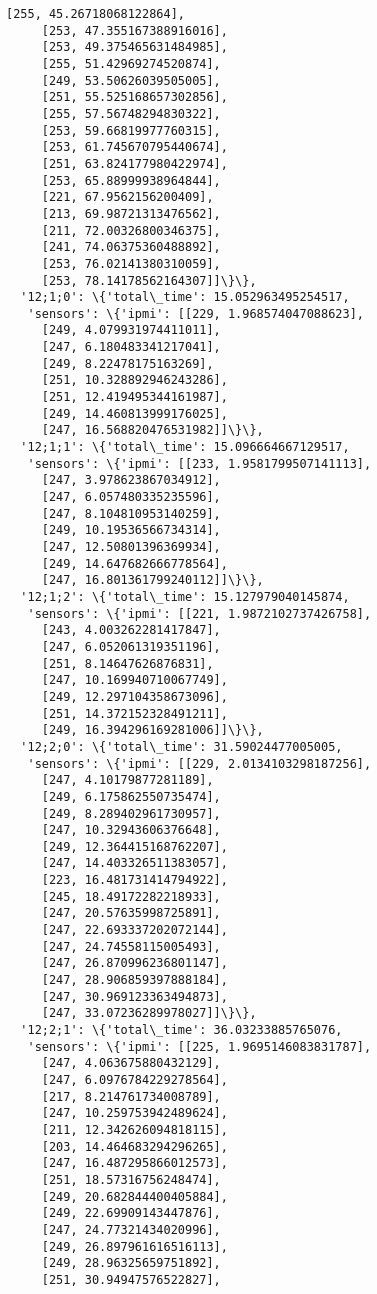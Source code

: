 \documentclass[11pt]{article}
\begin{document}
\begin{tcolorbox}[breakable, size=fbox, boxrule=.5pt, pad at break*=1mm, opacityfill=0]
\begin{Verbatim}[commandchars=\\\{\}]
     [255, 45.26718068122864],
     [253, 47.355167388916016],
     [253, 49.375465631484985],
     [255, 51.42969274520874],
     [249, 53.50626039505005],
     [251, 55.525168657302856],
     [255, 57.56748294830322],
     [253, 59.66819977760315],
     [253, 61.745670795440674],
     [251, 63.824177980422974],
     [253, 65.88999938964844],
     [221, 67.9562156200409],
     [213, 69.98721313476562],
     [211, 72.00326800346375],
     [241, 74.06375360488892],
     [253, 76.02141380310059],
     [253, 78.14178562164307]]\}\},
  '12;1;0': \{'total\_time': 15.052963495254517,
   'sensors': \{'ipmi': [[229, 1.968574047088623],
     [249, 4.079931974411011],
     [247, 6.180483341217041],
     [249, 8.22478175163269],
     [251, 10.328892946243286],
     [251, 12.419495344161987],
     [249, 14.460813999176025],
     [247, 16.568820476531982]]\}\},
  '12;1;1': \{'total\_time': 15.096664667129517,
   'sensors': \{'ipmi': [[233, 1.9581799507141113],
     [247, 3.978623867034912],
     [247, 6.057480335235596],
     [247, 8.104810953140259],
     [249, 10.19536566734314],
     [247, 12.50801396369934],
     [249, 14.647682666778564],
     [247, 16.801361799240112]]\}\},
  '12;1;2': \{'total\_time': 15.127979040145874,
   'sensors': \{'ipmi': [[221, 1.9872102737426758],
     [243, 4.003262281417847],
     [247, 6.052061319351196],
     [251, 8.14647626876831],
     [247, 10.169940710067749],
     [249, 12.297104358673096],
     [251, 14.372152328491211],
     [249, 16.394296169281006]]\}\},
  '12;2;0': \{'total\_time': 31.59024477005005,
   'sensors': \{'ipmi': [[229, 2.0134103298187256],
     [247, 4.10179877281189],
     [249, 6.175862550735474],
     [249, 8.289402961730957],
     [247, 10.32943606376648],
     [249, 12.364415168762207],
     [247, 14.403326511383057],
     [223, 16.481731414794922],
     [245, 18.49172282218933],
     [247, 20.57635998725891],
     [247, 22.693337202072144],
     [247, 24.74558115005493],
     [247, 26.870996236801147],
     [247, 28.906859397888184],
     [247, 30.969123363494873],
     [247, 33.07236289978027]]\}\},
  '12;2;1': \{'total\_time': 36.03233885765076,
   'sensors': \{'ipmi': [[225, 1.9695146083831787],
     [247, 4.063675880432129],
     [247, 6.0976784229278564],
     [217, 8.214761734008789],
     [247, 10.259753942489624],
     [211, 12.342626094818115],
     [203, 14.464683294296265],
     [247, 16.487295866012573],
     [251, 18.57316756248474],
     [249, 20.682844400405884],
     [249, 22.69909143447876],
     [247, 24.77321434020996],
     [249, 26.897961616516113],
     [249, 28.96325659751892],
     [251, 30.94947576522827],

\end{Verbatim}
\end{tcolorbox}
\end{document}
